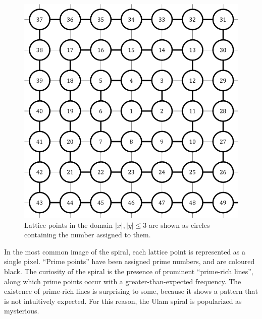 \documentclass{article}
\begin{document}
\begin{figure}[h!]
	\centering
	\includegraphics[scale=0.6]{f}
	\caption{Lattice points in the domain \(|x|,|y|{\leq}3\) are shown as circles containing the number assigned to them.}
	\label{fig:f}
\end{figure}

In the most common image of the spiral, each lattice point is represented as a single pixel. ``Prime points'' have been assigned prime numbers, and are coloured black. The curiosity of the spiral is the presence of prominent ``prime-rich lines'', along which prime points occur with a greater-than-expected frequency. The existence of prime-rich lines is surprising to some, because it shows a pattern that is not intuitively expected. For this reason, the Ulam spiral is popularized as mysterious.
\end{document}
